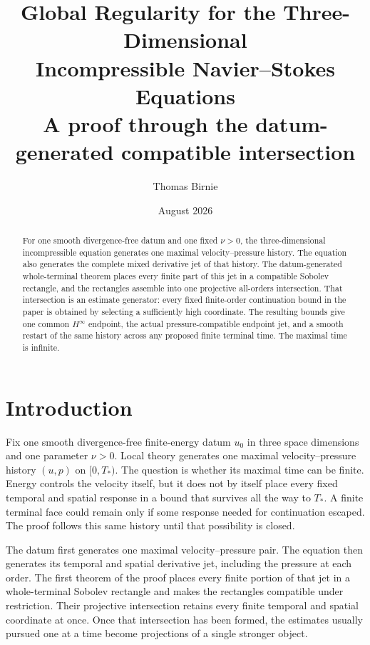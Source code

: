 \documentclass[11pt,letterpaper]{article}
\title{\vspace{-1.55em}\textbf{Global Regularity for the Three-Dimensional\\
Incompressible Navier{--}Stokes Equations}\\[0.42em]
\large A proof through the datum-generated compatible intersection}
\author{Thomas Birnie}
\date{August 2026}
\theoremstyle{definition}
\theoremstyle{remark}
\begin{document}
\maketitle
\vspace{-1.1em}

\begin{abstract}
For one smooth divergence-free datum and one fixed \(\nu>0\), the
three-dimensional incompressible equation generates one maximal
velocity--pressure history.  The equation also generates the complete mixed
derivative jet of that history.  The datum-generated whole-terminal theorem
places every finite part of this jet in a compatible Sobolev rectangle, and
the rectangles assemble into one projective all-orders intersection.  That
intersection is an estimate generator: every fixed finite-order continuation
bound in the paper is obtained by selecting a sufficiently high coordinate.
The resulting bounds give one common \(H^\infty\) endpoint, the actual
pressure-compatible endpoint jet, and a smooth restart of the same history
across any proposed finite terminal time.  The maximal time is infinite.
\end{abstract}

\section*{Introduction}

Fix one smooth divergence-free finite-energy datum \(u_0\) in three space
dimensions and one parameter \(\nu>0\).  Local theory generates one maximal
velocity--pressure history \((u,p)\) on \([0,T_*)\).  The question is whether
its maximal time can be finite.  Energy controls the velocity itself, but it
does not by itself place every fixed temporal and spatial response in a
bound that survives all the way to \(T_*\).  A finite terminal face could
remain only if some response needed for continuation escaped.  The proof
follows this same history until that possibility is closed.

The datum first generates one maximal velocity--pressure pair.  The equation then
generates its temporal and spatial derivative jet, including the pressure
at each order.  The first theorem of the proof places every finite portion
of that jet in a whole-terminal Sobolev rectangle and makes the rectangles
compatible under restriction.  Their projective intersection retains every
finite temporal and spatial coordinate at once.  Once that intersection has
been formed, the estimates usually pursued one at a time become projections
of a single stronger object.
\end{document}
